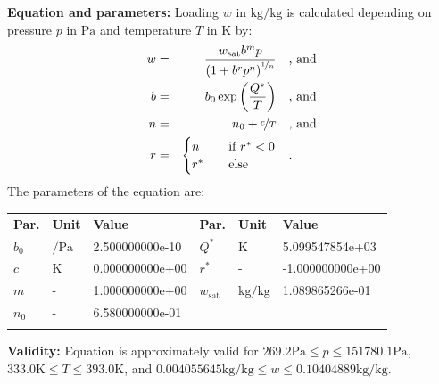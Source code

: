 \textbf{Equation and parameters:}
\newline
%
Loading $w$ in $\si{\kilogram\per\kilogram}$ is calculated depending on pressure $p$ in $\si{\pascal}$ and temperature $T$ in $\si{\kelvin}$ by:
%
\begin{equation*}
\begin{split}
w &=& \frac{w_\mathrm{sat} b^{m} p}{\left( 1 + b^{r} p^{n} \right)^{\nicefrac{1}{n}}} & \quad\text{, and} \\
b &=& b_0 \exp\left( \frac{Q^{*}}{T} \right) & \quad\text{, and} \\
n &=& n_0 + \nicefrac{c}{T} & \quad\text{, and} \\
r &=& \begin{cases} n & \quad \text{if } r^{*} < 0 \\ r^{*}  & \quad \text{else} \end{cases} & \quad\text{.}
\end{split}
\end{equation*}
%
The parameters of the equation are:
%
\begin{longtable}[l]{lll|lll}
\toprule
\addlinespace
\textbf{Par.} & \textbf{Unit} & \textbf{Value} &	\textbf{Par.} & \textbf{Unit} & \textbf{Value} \\
\addlinespace
\midrule
\endhead

\bottomrule
\endfoot
\bottomrule
\endlastfoot
\addlinespace

$b_0$ & $\si{\per\pascal}$ & 2.500000000e-10 & $Q^{*}$ & $\si{\kelvin}$ & 5.099547854e+03 \\
$c$ & $\si{\kelvin}$ & 0.000000000e+00 & $r^{*}$ & - & -1.000000000e+00 \\
$m$ & - & 1.000000000e+00 & $w_\mathrm{sat}$ & $\si{\kilogram\per\kilogram}$ & 1.089865266e-01 \\
$n_0$ & - & 6.580000000e-01 & & & \\

\addlinespace\end{longtable}

\textbf{Validity:}
\newline
Equation is approximately valid for $269.2 \si{\pascal} \leq p \leq 151780.1 \si{\pascal}$,  $333.0 \si{\kelvin} \leq T \leq 393.0 \si{\kelvin}$, and $0.004055645 \si{\kilogram\per\kilogram} \leq w \leq 0.10404889 \si{\kilogram\per\kilogram}$.
\newline

